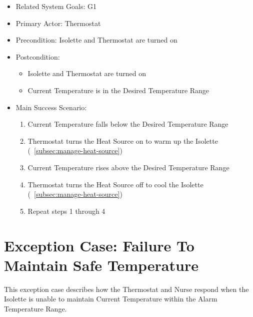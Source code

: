 \begin{itemize}
\item Related System Goals: G1
\item Primary Actor: Thermostat
\item Precondition: Isolette and Thermostat are turned on
\item Postcondition:
  \begin{itemize}
  \item Isolette and Thermostat are turned on
  \item Current Temperature is in the Desired Temperature Range
  \end{itemize}
\item Main Success Scenario:
  \begin{enumerate}
  \item Current Temperature falls below the Desired Temperature Range
  \item Thermostat turns the Heat Source on to warm up the Isolette (~\ref{subsec:manage-heat-source})
  \item Current Temperature rises above the Desired Temperature Range
  \item Thermostat turns the Heat Source off to cool the Isolette (~\ref{subsec:manage-heat-source})
  \item Repeat steps 1 through 4
  \end{enumerate}
\end{itemize}

\section{Exception Case: Failure To Maintain Safe Temperature}
\label{sec:ec-failure-maintain-safe-temperature}

This exception case describes how the Thermostat and Nurse respond when the Isolette is unable
to maintain Current Temperature within the Alarm Temperature Range.

